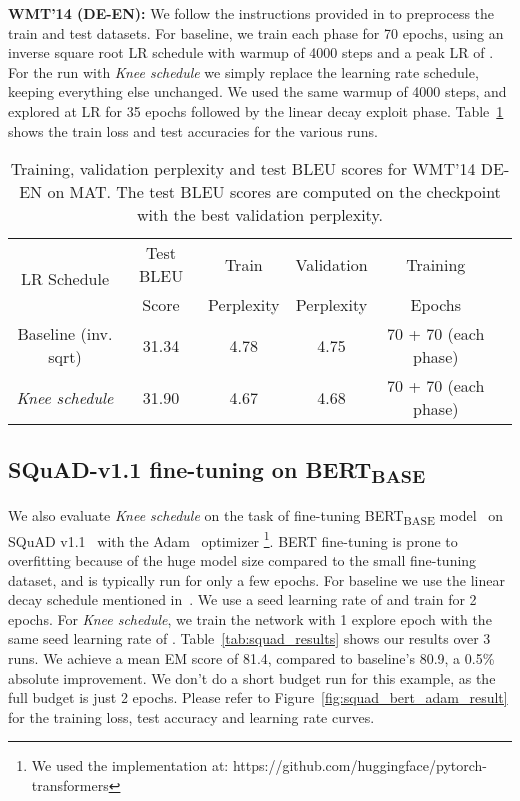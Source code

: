 \documentclass{article} \usepackage{iclr2021_conference,times}
\newcommand{\lrschedule}{\textit{Knee schedule}}
\begin{document}
\textbf{WMT'14 (DE-EN):} We follow the instructions provided in \cite{mat_fan2020} to preprocess the train and test datasets. For baseline, we train each phase for 70 epochs, using an inverse square root LR schedule with warmup of 4000 steps and a peak LR of . For the run with \lrschedule{} we simply replace the learning rate schedule, keeping everything else unchanged. We used the same warmup of 4000 steps, and explored at  LR for 35 epochs followed by the linear decay exploit phase. Table~\ref{tab:wmt_mat_results_train_loss_test_acc} shows the train loss and test accuracies for the various runs.
\begin{table}[h]
\small
\centering
\caption{Training, validation perplexity and test BLEU scores for WMT'14 DE-EN on MAT. The test BLEU scores are computed on the checkpoint with the best validation perplexity.}
\label{tab:wmt_mat_results_train_loss_test_acc}
{\setlength{\extrarowheight}{1pt}\begin{tabular}{cccccc}
\toprule
  \multirow{2}{*}{LR Schedule} & Test BLEU  & Train & Validation  & Training \\
  &  Score & Perplexity  & Perplexity & Epochs \\ 
 \midrule
  Baseline (inv. sqrt)  &  31.34  & 4.78  & 4.75  & 70 + 70 (each phase) \\
  \lrschedule{}         & 31.90  & 4.67  & 4.68   & 70 + 70 (each phase) \\ 
\bottomrule 
\end{tabular}}

\end{table}

\subsection{SQuAD-v1.1 fine-tuning on BERT\textsubscript{BASE}}

We also evaluate \lrschedule{} on the task of fine-tuning BERT\textsubscript{BASE} model~\cite{devlin2018bert} on SQuAD v1.1~\cite{rajpurkar2016squad} with the Adam~\cite{kingma2014adam} optimizer \footnote{We used the implementation at: https://github.com/huggingface/pytorch-transformers}. BERT fine-tuning is prone to overfitting because of the huge model size compared to the small fine-tuning dataset, and is typically run for only a few epochs. For baseline we use the linear decay schedule mentioned in~\cite{devlin2018bert}. We use a seed learning rate of  and train for 2 epochs. For \lrschedule{}, we train the network with 1 explore epoch with the same seed learning rate of . Table~\ref{tab:squad_results} shows our results over 3 runs. We achieve a mean EM score of 81.4, compared to baseline's 80.9, a 0.5\% absolute improvement. We don't do a short budget run for this example, as the full budget is just 2 epochs. Please refer to Figure~\ref{fig:squad_bert_adam_result} for the training loss, test accuracy and learning rate curves.
\end{document}
